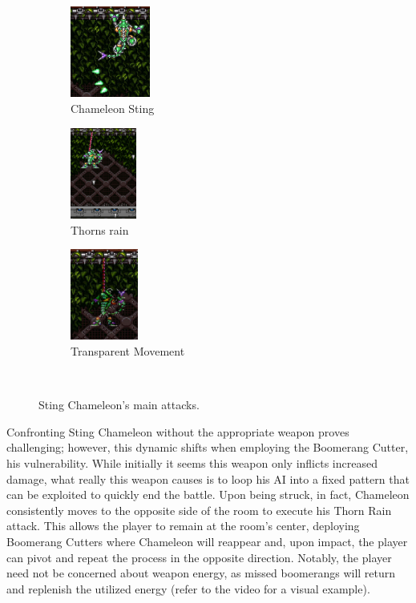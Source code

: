 \begin{figure}[htp]
	\ContinuedFloat
	\centering
	\begin{subfigure}{0.3\linewidth}
		\centering
		\includegraphics[height=3cm]{figures/X1/Sting_chameleon/Chameleon_sting.jpg}
		\caption{Chameleon Sting}
	\end{subfigure}
	\begin{subfigure}{0.3\linewidth}
		\centering
		\includegraphics[height=3cm]{figures/X1/Sting_chameleon/Chameleon_spike_fall.jpg}
		\caption{Thorns rain}
	\end{subfigure}
	\begin{subfigure}{.35\linewidth}
		\centering
		\includegraphics[height=3cm]{figures/X1/Sting_chameleon/Chameleon_blend.jpg}
		\caption{Transparent Movement}
	\end{subfigure}\\
	\caption{Sting Chameleon's main attacks.}
\end{figure} 
Confronting Sting Chameleon without the appropriate weapon proves challenging; however, this dynamic shifts when employing the Boomerang Cutter, his vulnerability. While initially it seems this weapon only inflicts increased damage, what really this weapon causes is to loop his AI into a fixed pattern that can be exploited to quickly end the battle. Upon being struck, in fact, Chameleon consistently moves to the opposite side of the room to execute his Thorn Rain attack. This allows the player to remain at the room's center, deploying Boomerang Cutters where Chameleon will reappear and, upon impact, the player can pivot and repeat the process in the opposite direction. Notably, the player need not be concerned about weapon energy, as missed boomerangs will return and replenish the utilized energy (refer to the video  for a visual example).

